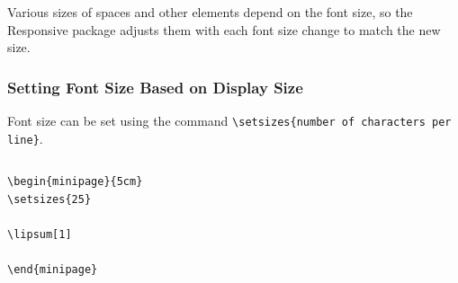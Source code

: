 Various sizes of spaces and other elements depend on the font size, so the
Responsive package adjusts them with each font size change to match the new
size.



\begin{frame}[fragile]
  \frametitle{Setting Font Size Based on Display Size}

  Font size can be set using the command \verb|\setsizes{number of characters per line}|.
  
\begin{columns}
  \begin{column}{0.5\textwidth}
\begin{verbatim}
\begin{minipage}{5cm}
\setsizes{25}

\lipsum[1]

\end{minipage}
\end{verbatim}
\end{column}
\begin{column}{0.5\textwidth}

\end{column}
\end{columns}

\end{frame}

